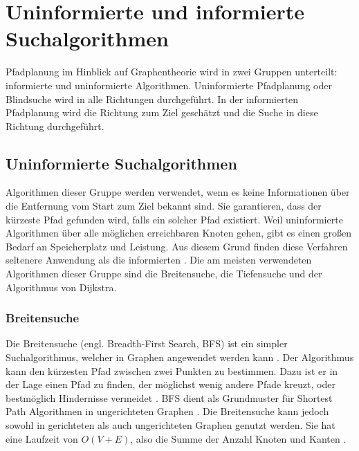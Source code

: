 \chapter{Uninformierte und informierte Suchalgorithmen}

Pfadplanung im Hinblick auf Graphentheorie wird in zwei Gruppen unterteilt: informierte und uninformierte Algorithmen. Uninformierte Pfadplanung oder Blindsuche wird in alle Richtungen durchgeführt. In der informierten Pfadplanung wird die Richtung zum Ziel geschätzt und die Suche in diese Richtung durchgeführt\cite{comAnal}. %

\section{Uninformierte Suchalgorithmen}
Algorithmen dieser Gruppe werden verwendet, wenn es keine Informationen über die Entfernung vom Start zum Ziel bekannt sind. %
Sie garantieren, dass der kürzeste Pfad gefunden wird, falls ein solcher Pfad existiert\cite{comAnal}. Weil uninformierte Algorithmen über alle möglichen erreichbaren Knoten gehen, gibt es einen großen Bedarf an Speicherplatz und Leistung. Aus diesem Grund finden diese Verfahren seltenere Anwendung als die informierten \cite{sim}\cite{comAnal}. %
Die am meisten verwendeten Algorithmen dieser Gruppe sind die Breitensuche, die Tiefensuche und der Algorithmus von Dijkstra.

\subsection{Breitensuche}

Die Breitensuche (engl. Breadth-First Search, BFS) ist ein simpler Suchalgorithmus, welcher in Graphen angewendet werden kann \cite{Cormen.2009}. Der Algorithmus kann den kürzesten Pfad zwischen zwei Punkten zu bestimmen. Dazu ist er in der Lage einen Pfad zu finden, der möglichst wenig andere Pfade kreuzt, oder bestmöglich Hindernisse vermeidet \cite{Lee.1961}. BFS dient als Grundmuster für Shortest Path Algorithmen in ungerichteten Graphen \cite{Ottmann.2017}. Die Breitensuche kann jedoch sowohl in gerichteten als auch ungerichteten Graphen genutzt werden. Sie hat eine Laufzeit von $O(V + E)$, also die Summe der Anzahl Knoten und Kanten \cite{Cormen.2009}.

